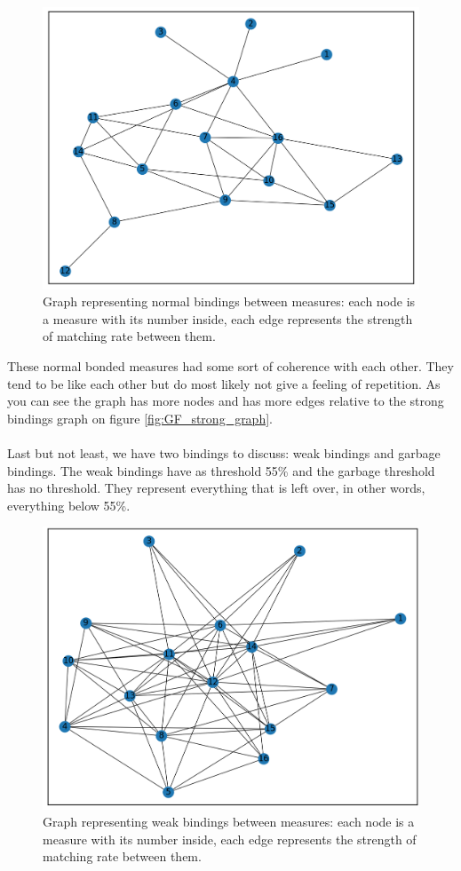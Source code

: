 \documentclass[a4paper]{article}
\begin{document}
\begin{figure}[H]
	\includegraphics[width=\textwidth]{Fotos/bindings_graph/Godfather_16_normal.png}
	\caption{Graph representing normal bindings between measures: each node is a measure with its number inside, each edge represents the strength of matching rate between them.}
	\label{fig:GF_normal_graph}
\end{figure}
These normal bonded measures had some sort of coherence with each other. They tend to be like each other but do most likely not give a feeling of repetition. As you can see the graph has more nodes and has more edges relative to the strong bindings graph on figure \ref{fig:GF_strong_graph}.
\\\\
Last but not least, we have two bindings to discuss: weak bindings and garbage bindings. The weak bindings have as threshold 55\% and the garbage threshold has no threshold. They represent everything that is left over, in other words, everything below 55\%.

\begin{figure}[H]
	\includegraphics[width=\textwidth]{Fotos/bindings_graph/Godfather_16_weak.png}
	\caption{Graph representing weak bindings between measures: each node is a measure with its number inside, each edge represents the strength of matching rate between them.}
	\label{fig:GF_weak_graph}
\end{figure}
\end{document}
